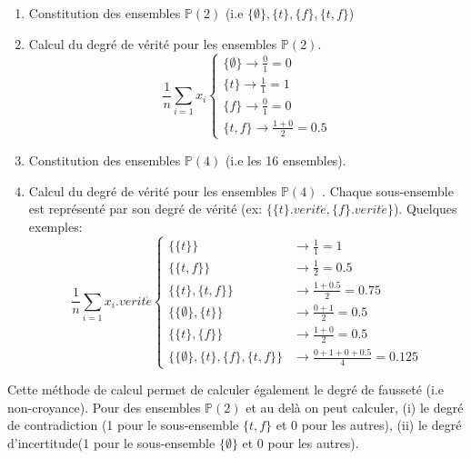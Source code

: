 \begin{refsegment}
\begin{enumerate}
    \item Constitution des ensembles $\mathbb{P}(2)$ (i.e $\{\emptyset\},\{t\},\{f\},\{t,f\}$)
    \item Calcul du degré de vérité pour les ensembles  $\mathbb{P}(2)$.
    \begin{equation*}
    \frac{1}{n} \sum_{i=1}x_{i}
    \begin{cases}
    \{\emptyset\} \to \frac{0}{1} = 0 \\
    \{t\} \to \frac{1}{1} = 1 \\
    \{f\} \to \frac{0}{1} = 0 \\
    \{t,f\} \to \frac{1+0}{2} = 0.5
    \end{cases}
    \end{equation*}
    \item Constitution des ensembles $\mathbb{P}(4)$ (i.e les 16 ensembles).
    \item Calcul du degré de vérité pour les ensembles  $\mathbb{P}(4)$ . Chaque sous-ensemble est représenté par son degré de vérité (ex: $\{\{t\}.verit\acute{e},\{f\}.verit\acute{e}\}$). Quelques exemples:
    \begin{equation*}
    \frac{1}{n} \sum_{i=1}x_{i}.verit\acute{e}
    \begin{cases}
    \{\{t\}\}                               &\to \frac{1}{1} = 1 \\
    \{\{t,f\}\}                             &\to \frac{1}{2} = 0.5 \\
    \{\{t\},\{t,f\}\}                       &\to \frac{1+0.5}{2} = 0.75 \\
    \{\{\emptyset\},\{t\}\}                 &\to \frac{0+1}{2} = 0.5 \\
    \{\{t\},\{f\}\}                         &\to \frac{1+0}{2} = 0.5 \\
    \{\{\emptyset\},\{t\},\{f\},\{t,f\}\}   &\to \frac{0+1+0+0.5}{4} = 0.125
    \end{cases}
    \end{equation*}
\end{enumerate}

Cette méthode de calcul permet de calculer également le degré de fausseté (i.e non-croyance). Pour des ensembles  $\mathbb{P}(2)$ et au delà on peut calculer, (i) le degré de contradiction (1 pour le sous-ensemble $\{t,f\}$ et 0 pour les autres), (ii) le degré d'incertitude(1 pour le sous-ensemble $\{\emptyset\}$ et 0 pour les autres).


\end{refsegment}
